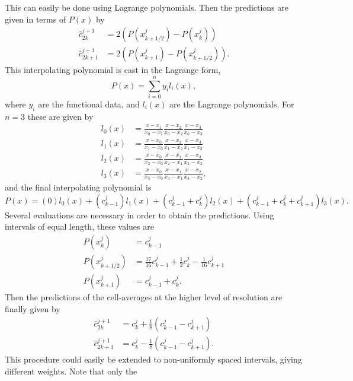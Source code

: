 \documentclass[12pt,letterpaper]{article}
\begin{document}
This can easily be done using Lagrange polynomials. Then the predictions are given in terms of $P(x)$ by
\begin{align}
	\hat{c}^{j+1}_{2k} &= 2 \left( P(x^{j}_{k+1/2}) - P(x^{j}_{k}) \right) \\
	\hat{c}^{j+1}_{2k+1} &= 2 \left( P(x^{j}_{k+1}) - P(x^{j}_{k+1/2}) \right).
\end{align}
This interpolating polynomial is cast in the Lagrange form,
\begin{equation}
P(x) = \sum_{i=0}^{n} y_{i} l_{i}(x),
\end{equation}
where $y_{i}$ are the functional data, and $l_{i}(x)$ are the Lagrange polynomials. For $n=3$ these
are given by
\begin{align}
    l_{0}(x) &= \frac{x-x_1}{x_0-x_1} \frac{x-x_2}{x_0-x_2} \frac{x-x_3}{x_0-x_3} \\
    l_{1}(x) &= \frac{x-x_0}{x_1-x_0} \frac{x-x_2}{x_1-x_2} \frac{x-x_3}{x_1-x_3} \\
    l_{2}(x) &= \frac{x-x_0}{x_2-x_0} \frac{x-x_1}{x_2-x_1} \frac{x-x_3}{x_2-x_3} \\
    l_{3}(x) &= \frac{x-x_0}{x_3-x_0} \frac{x-x_1}{x_3-x_1} \frac{x-x_2}{x_3-x_2},
\end{align}
and the final interpolating polynomial is
\begin{equation}
	P(x) = (0) l_{0}(x) + ( c^{j}_{k-1} ) l_{1}(x) + ( c^{j}_{k-1} + c^{j}_{k} ) l_{2}(x)
		+ ( c^{j}_{k-1} + c^{j}_{k} + c^{j}_{k+1} ) l_{3}(x).
\end{equation}
Several evaluations are necessary in order to obtain the predictions. Using intervals of equal length, these values are
\begin{align}
	P(x^{j}_{k}) &= c^{j}_{k-1} \\
	P(x^{j}_{k+1/2}) &= \frac{17}{16} c^{j}_{k-1} + \frac{1}{2} c^{j}_{k} - \frac{1}{16} c^{j}_{k+1} \\
	P(x^{j}_{k+1}) &= c^{j}_{k-1} + c^{j}_{k}.
\end{align}
Then the predictions of the cell-averages at the higher level of resolution are finally given by
\begin{align}
	\hat{c}^{j+1}_{2k} & = c^{j}_{k} + \frac{1}{8} \left( c^{j}_{k-1} - c^{j}_{k+1} \right) \\
	\hat{c}^{j+1}_{2k+1} & = c^{j}_{k} - \frac{1}{8} \left( c^{j}_{k-1} - c^{j}_{k+1} \right).
\end{align}
This procedure could easily be extended to non-uniformly
spaced intervals, giving different weights. Note that only the
\end{document}

